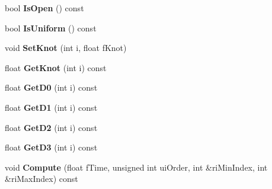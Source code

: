 \begin{DoxyCompactItemize}
\item 
bool {\bfseries Is\+Open} () const \hypertarget{class_i_dream_sky_1_1_b_spline_basis_a4981bd7ed53f66aebbe5dc1257d65333}{}\label{class_i_dream_sky_1_1_b_spline_basis_a4981bd7ed53f66aebbe5dc1257d65333}

\item 
bool {\bfseries Is\+Uniform} () const \hypertarget{class_i_dream_sky_1_1_b_spline_basis_a30c2cf66fe5861e2baea796fd75b7ccc}{}\label{class_i_dream_sky_1_1_b_spline_basis_a30c2cf66fe5861e2baea796fd75b7ccc}

\item 
void {\bfseries Set\+Knot} (int i, float f\+Knot)\hypertarget{class_i_dream_sky_1_1_b_spline_basis_a9802026a1e6481d233a63b4e3f1ea18c}{}\label{class_i_dream_sky_1_1_b_spline_basis_a9802026a1e6481d233a63b4e3f1ea18c}

\item 
float {\bfseries Get\+Knot} (int i) const \hypertarget{class_i_dream_sky_1_1_b_spline_basis_ae07f87cc46be5561178a135426176f54}{}\label{class_i_dream_sky_1_1_b_spline_basis_ae07f87cc46be5561178a135426176f54}

\item 
float {\bfseries Get\+D0} (int i) const \hypertarget{class_i_dream_sky_1_1_b_spline_basis_a263db0b03958b547a683c4118f43699d}{}\label{class_i_dream_sky_1_1_b_spline_basis_a263db0b03958b547a683c4118f43699d}

\item 
float {\bfseries Get\+D1} (int i) const \hypertarget{class_i_dream_sky_1_1_b_spline_basis_a286f97a825e5403270485c08877203ea}{}\label{class_i_dream_sky_1_1_b_spline_basis_a286f97a825e5403270485c08877203ea}

\item 
float {\bfseries Get\+D2} (int i) const \hypertarget{class_i_dream_sky_1_1_b_spline_basis_a6bcd89d536d9db8a02f84421a93381a9}{}\label{class_i_dream_sky_1_1_b_spline_basis_a6bcd89d536d9db8a02f84421a93381a9}

\item 
float {\bfseries Get\+D3} (int i) const \hypertarget{class_i_dream_sky_1_1_b_spline_basis_a3eb66f3eafa049070a43348e23df225f}{}\label{class_i_dream_sky_1_1_b_spline_basis_a3eb66f3eafa049070a43348e23df225f}

\item 
void {\bfseries Compute} (float f\+Time, unsigned int ui\+Order, int \&ri\+Min\+Index, int \&ri\+Max\+Index) const \hypertarget{class_i_dream_sky_1_1_b_spline_basis_ac28ad1e3c2c0957b6197aa40442359da}{}\label{class_i_dream_sky_1_1_b_spline_basis_ac28ad1e3c2c0957b6197aa40442359da}

\end{DoxyCompactItemize}
